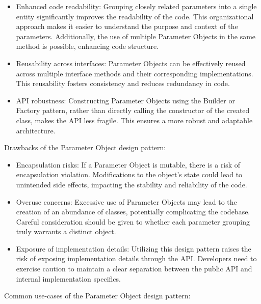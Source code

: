 \begin{itemize}
    \item Enhanced code readability:
    Grouping closely related parameters into a single entity significantly improves the readability of the code.
    This organizational approach makes it easier to understand the purpose and context of the parameters.
    Additionally, the use of multiple Parameter Objects in the same method is possible, enhancing code structure.
    \item Reusability across interfaces:
    Parameter Objects can be effectively reused across multiple interface methods and their
    corresponding implementations.
    This reusability fosters consistency and reduces redundancy in code.
    \item API robustness:
    Constructing Parameter Objects using the Builder or Factory pattern, rather than directly calling the constructor
    of the created class, makes the API less fragile.
    This ensures a more robust and adaptable architecture.
\end{itemize}

Drawbacks of the Parameter Object design pattern:

\begin{itemize}
    \item Encapsulation risks:
    If a Parameter Object is mutable, there is a risk of encapsulation violation.
    Modifications to the object's state could lead to unintended side effects,
    impacting the stability and reliability of the code.
    \item Overuse concerns:
    Excessive use of Parameter Objects may lead to the creation of an abundance of classes, potentially complicating
    the codebase.
    Careful consideration should be given to whether each parameter grouping truly warrants a distinct object.
    \item Exposure of implementation details:
    Utilizing this design pattern raises the risk of exposing implementation details through the API\@.
    Developers need to exercise caution to maintain a clear separation between the public API and internal
    implementation specifics.
\end{itemize}

Common use-cases of the Parameter Object design pattern:

